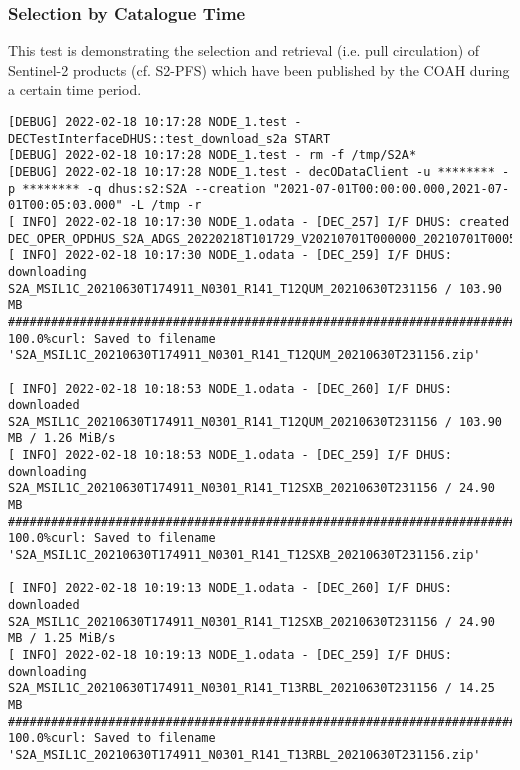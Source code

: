 \documentclass[dec_sum_main.tex]{subfiles}
\begin{document}
\subsubsection{Selection by Catalogue Time}
This test is demonstrating the selection and retrieval (i.e. pull circulation) of Sentinel-2 products (cf. S2-PFS) which have been published by the COAH during a certain time period. \newline

 \newline

\begin{Verbatim}[fontsize=\tiny]
[DEBUG] 2022-02-18 10:17:28 NODE_1.test - DECTestInterfaceDHUS::test_download_s2a START
[DEBUG] 2022-02-18 10:17:28 NODE_1.test - rm -f /tmp/S2A*
[DEBUG] 2022-02-18 10:17:28 NODE_1.test - decODataClient -u ******** -p ******** -q dhus:s2:S2A --creation "2021-07-01T00:00:00.000,2021-07-01T00:05:03.000" -L /tmp -r
[ INFO] 2022-02-18 10:17:30 NODE_1.odata - [DEC_257] I/F DHUS: created DEC_OPER_OPDHUS_S2A_ADGS_20220218T101729_V20210701T000000_20210701T000503_3_0.xml
[ INFO] 2022-02-18 10:17:30 NODE_1.odata - [DEC_259] I/F DHUS: downloading S2A_MSIL1C_20210630T174911_N0301_R141_T12QUM_20210630T231156 / 103.90 MB
########################################################################################################################################################################################################## 100.0%curl: Saved to filename 'S2A_MSIL1C_20210630T174911_N0301_R141_T12QUM_20210630T231156.zip'

[ INFO] 2022-02-18 10:18:53 NODE_1.odata - [DEC_260] I/F DHUS: downloaded S2A_MSIL1C_20210630T174911_N0301_R141_T12QUM_20210630T231156 / 103.90 MB / 1.26 MiB/s
[ INFO] 2022-02-18 10:18:53 NODE_1.odata - [DEC_259] I/F DHUS: downloading S2A_MSIL1C_20210630T174911_N0301_R141_T12SXB_20210630T231156 / 24.90 MB
########################################################################################################################################################################################################## 100.0%curl: Saved to filename 'S2A_MSIL1C_20210630T174911_N0301_R141_T12SXB_20210630T231156.zip'

[ INFO] 2022-02-18 10:19:13 NODE_1.odata - [DEC_260] I/F DHUS: downloaded S2A_MSIL1C_20210630T174911_N0301_R141_T12SXB_20210630T231156 / 24.90 MB / 1.25 MiB/s
[ INFO] 2022-02-18 10:19:13 NODE_1.odata - [DEC_259] I/F DHUS: downloading S2A_MSIL1C_20210630T174911_N0301_R141_T13RBL_20210630T231156 / 14.25 MB
########################################################################################################################################################################################################## 100.0%curl: Saved to filename 'S2A_MSIL1C_20210630T174911_N0301_R141_T13RBL_20210630T231156.zip'


\end{Verbatim}
\end{document}
